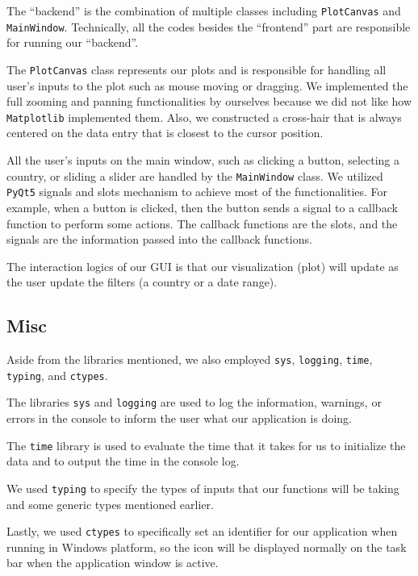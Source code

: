 \documentclass[fontsize=11pt]{article}
\begin{document}
    The ``backend'' is the combination of multiple classes including \verb|PlotCanvas| and \verb|MainWindow|. Technically, all the codes besides the ``frontend'' part are responsible for running our ``backend''.

    The \verb|PlotCanvas| class represents our plots and is responsible for handling all user's inputs to the plot such as mouse moving or dragging. We implemented the full zooming and panning functionalities by ourselves because we did not like how \verb|Matplotlib| implemented them. Also, we constructed a cross-hair that is always centered on the data entry that is closest to the cursor position.

    All the user's inputs on the main window, such as clicking a button, selecting a country, or sliding a slider are handled by the \verb|MainWindow| class. We utilized \verb|PyQt5| signals and slots mechanism to achieve most of the functionalities. For example, when a button is clicked, then the button sends a signal to a callback function to perform some actions. The callback functions are the slots, and the signals are the information passed into the callback functions.

    The interaction logics of our GUI is that our visualization (plot) will update as the user update the filters (a country or a date range).

    \subsection{Misc}

    Aside from the libraries mentioned, we also employed \verb|sys|, \verb|logging|, \verb|time|, \verb|typing|, and \verb|ctypes|.

    The libraries \verb|sys| and \verb|logging| are used to log the information, warnings, or errors in the console to inform the user what our application is doing. 

    The \verb|time| library is used to evaluate the time that it takes for us to initialize the data and to output the time in the console log.

    We used \verb|typing| to specify the types of inputs that our functions will be taking and some generic types mentioned earlier.

    Lastly, we used \verb|ctypes| to specifically set an identifier for our application when running in Windows platform, so the icon will be displayed normally on the task bar when the application window is active.
\end{document}
